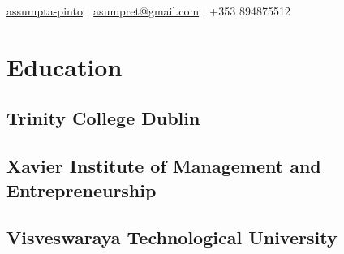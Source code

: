 \documentclass[]{aj-resume-openfont}
\begin{document}
%
%
\lastupdated

%
%

 { 
\href{https://www.linkedin.com/in/assumpta-pinto}{\linkedinsocialsymbol{} assumpta-pinto} |
\href{mailto:asumpret@gmail.com}{\emailsymbol{}asumpret@gmail.com} | 
\mobilephonesymbol{}+353 894875512 \linebreak \locationsymbol{}\address{Galway, Ireland}}

%
%

\begin{minipage}[t]{0.33\textwidth} 


\section{Education} 

\subsection{Trinity College Dublin}
\sectionsep

\subsection{Xavier Institute of Management and Entrepreneurship}
\sectionsep

\subsection{Visveswaraya Technological University}
\sectionsep



\end{minipage}
\end{document}
